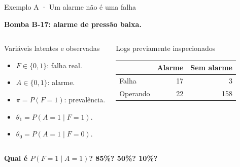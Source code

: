 \documentclass[aspectratio=169,11pt]{beamer}
\newcommand{\boxhead}[2]{\begin{block}{#1}#2\end{block}}
\begin{document}
\begin{frame}{Exemplo A · Um alarme não é uma falha}
\vspace{.2cm}
{\Large\bfseries Bomba B-17: alarme de pressão baixa.\par}
\vspace{.3cm}
\begin{columns}[T]
\boxhead{Variáveis latentes e observadas}{\begin{itemize}\item $F\in\{0,1\}$: falha real.\item $A\in\{0,1\}$: alarme.\item $\pi=P(F=1)$: prevalência.\item $\theta_1=P(A=1\mid F=1)$.\item $\theta_0=P(A=1\mid F=0)$.\end{itemize}}
\boxhead{Logs previamente inspecionados}{\begin{center}\begin{tabular}{lrr}\toprule &Alarme&Sem alarme\\\midrule Falha&17&3\\Operando&22&158\\\bottomrule\end{tabular}\end{center}\vspace{.08cm}{\scriptsize 200 casos sintéticos, com rótulos completos.}}
\end{columns}
\vspace{.22cm}
\begin{center}{\color{petrol}\bfseries Qual é $P(F=1\mid A=1)$? 85\%? 50\%? 10\%?}\end{center}
\end{frame}
\end{document}
